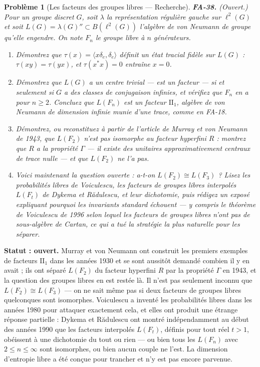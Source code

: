 \documentclass[11pt]{article}
\newtheorem{problem}{Problème}
\begin{document}
\begin{problem}[{Les facteurs des groupes libres --- Recherche}]
\textbf{FA-38.} (Ouvert.) Pour un groupe discret $ G $, soit $ \lambda $ la représentation
régulière gauche sur $ \ell^2(G) $ et soit $ L(G) = \lambda(G)'' \subset B(\ell^2(G)) $ l'algèbre de
von Neumann de groupe qu'elle engendre. On note $ F_n $ le groupe libre à $ n $ générateurs.
\begin{enumerate}
\item[(a)] Démontrez que $ \tau(x) = \langle x\delta_e, \delta_e \rangle $ définit un état tracial fidèle sur
$ L(G) $ : $ \tau(xy) = \tau(yx) $, et $ \tau(x^{*}x) = 0 $ entraîne $ x = 0 $.
\item[(b)] Démontrez que $ L(G) $ a un centre trivial --- est un facteur --- si et seulement si $ G $ a des
classes de conjugaison infinies, et vérifiez que $ F_n $ en a pour $ n \ge 2 $. Concluez que
$ L(F_n) $ est un facteur $ \mathrm{II}_1 $, algèbre de von Neumann de dimension infinie munie d'une
trace, comme en FA-18.
\item[(c)] Démontrez, ou reconstituez à partir de l'article de Murray et von Neumann de 1943, que $ L(F_2) $
n'est pas isomorphe au facteur hyperfini $ R $ : montrez que $ R $ a la propriété $\Gamma$ --- il existe des
unitaires approximativement centraux de trace nulle --- et que $ L(F_2) $ ne l'a pas.
\item[(d)] Voici maintenant la question ouverte : a-t-on $ L(F_2) \cong L(F_3) $ ? Lisez les probabilités
libres de Voiculescu, les facteurs de groupes libres interpolés $ L(F_t) $ de Dykema et R\u{a}dulescu, et
leur dichotomie, puis rédigez un exposé expliquant pourquoi les invariants standard échouent --- y compris
le théorème de Voiculescu de 1996 selon lequel les facteurs de groupes libres n'ont pas de sous-algèbre
de Cartan, ce qui a tué la stratégie la plus naturelle pour les séparer.
\end{enumerate}

\end{problem}

\noindent \textbf{Statut : ouvert.} Murray et von Neumann ont construit les premiers exemples de
facteurs $ \mathrm{II}_1 $ dans les années 1930 et se sont aussitôt demandé combien il y en avait ; ils
ont séparé $ L(F_2) $ du facteur hyperfini $ R $ par la propriété $\Gamma$ en 1943, et la question des groupes
libres en est restée là. Il n'est pas seulement inconnu que $ L(F_2) \cong L(F_3) $ --- on ne sait même pas
si deux facteurs de groupes libres quelconques sont isomorphes. Voiculescu a inventé les probabilités libres
dans les années 1980 pour attaquer exactement cela, et elles ont produit une étrange réponse partielle :
Dykema et R\u{a}dulescu ont montré indépendamment au début des années 1990 que les facteurs interpolés
$ L(F_t) $, définis pour tout réel $ t > 1 $, obéissent à une dichotomie du tout ou rien --- ou bien
tous les $ L(F_n) $ avec $ 2 \le n \le \infty $ sont isomorphes, ou bien aucun couple ne l'est. La
dimension d'entropie libre a été conçue pour trancher et n'y est pas encore parvenue.
\end{document}
